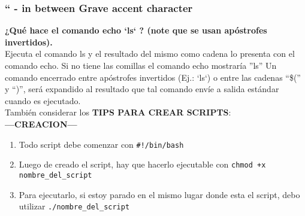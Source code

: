 \documentclass[a4paper,11pt,spanish]{article} %
\begin{document}
\subsubsection{`` - in between Grave accent character }

\textbf{¿Qué hace el comando echo `ls` ? (note que se usan apóstrofes invertidos).}\\

Ejecuta el comando ls y el resultado del mismo como cadena lo presenta con el comando echo.
Si no tiene las comillas el comando echo mostraría ''ls''
Un comando encerrado entre apóstrofes invertidos (Ej.: `ls`) o entre las cadenas ``\$('' y ``)'',
será expandido al resultado que tal comando envíe a salida estándar cuando es ejecutado.\\

También considerar los \textbf{TIPS PARA CREAR SCRIPTS}:\\

\textbf{---CREACION---}
\begin{enumerate}
\item Todo script debe comenzar con \texttt{\#!/bin/bash}
\item Luego de creado el script, hay que hacerlo ejecutable con 
\texttt{chmod +x nombre\_del\_script}
\item Para ejecutarlo, si estoy parado en el mismo lugar donde esta el script, debo 
utilizar \texttt{./nombre\_del\_script}
\end{enumerate}
\end{document}
